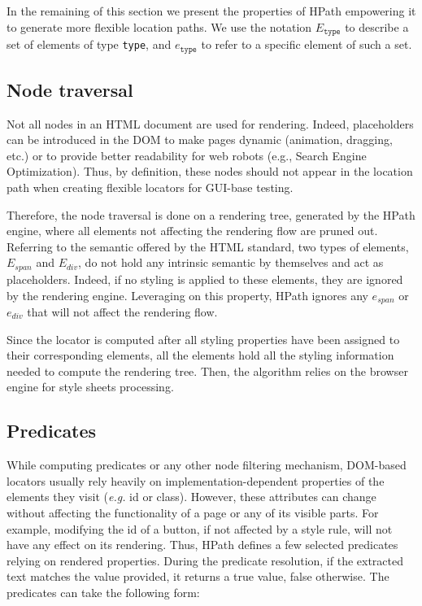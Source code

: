 In the remaining of this section we present the properties of HPath empowering it to generate more flexible location paths. We use the notation $E_{\texttt{type}}$ to describe a set of elements of type \texttt{type}, and $e_\texttt{type}$ to refer to a specific element of such a set.

\subsection{Node traversal}
\label{sec:hpath-hpath-node-traversal}

Not all nodes in an HTML document are used for rendering. Indeed, placeholders can be introduced in the DOM to make pages dynamic (animation, dragging, etc.) or to provide better readability for web robots (e.g., Search Engine Optimization). Thus, by definition, these nodes should not appear in the location path when creating flexible locators for GUI-base testing. 

Therefore, the node traversal is done on a rendering tree, generated by the HPath engine, where all elements not affecting the rendering flow are pruned out. Referring to the semantic offered by the HTML standard, two types of elements, $E_{span}$ and $E_{div}$, do not hold any intrinsic semantic by themselves and act as placeholders. Indeed, if no styling is applied to these elements, they are ignored by the rendering engine\cite{Grigorik2019}. Leveraging on this property, HPath ignores any $e_{span}$ or $e_{div}$ that will not affect the rendering flow.  

Since the locator is computed after all styling properties have been assigned to their corresponding elements, all the elements hold all the styling information needed to compute the rendering tree. Then, the algorithm relies on the browser engine for style sheets processing. 

\subsection{Predicates}
\label{sec:hpath-hpath-predicates}

While computing predicates or any other node filtering mechanism, DOM-based locators usually rely heavily on implementation-dependent properties of the elements they visit (\emph{e.g.} id or class). However, these attributes can change without affecting the functionality of a page or any of its visible parts. For example, modifying the id of a button, if not affected by a style rule, will not have any effect on its rendering. Thus, HPath defines a few selected predicates relying on rendered properties. During the predicate resolution, if the extracted text matches the value provided, it returns a true value, false otherwise. The predicates can take the following form:

